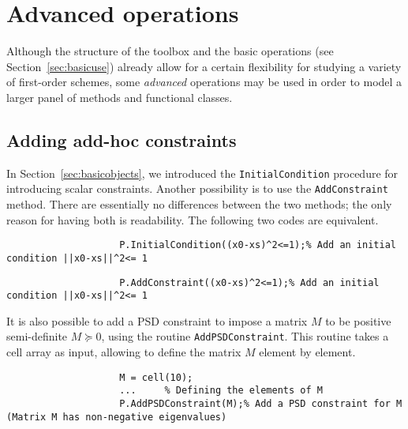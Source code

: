 \documentclass[11pt,a4paper]{article}
\begin{document}
					\section{Advanced operations}		%

					Although the structure of the toolbox and the basic operations (see Section~\ref{sec:basicuse}) already allow for a certain flexibility for studying a variety of first-order schemes, some \emph{advanced} operations may be used in order to model a larger panel of methods and functional classes.

					\subsection{Adding add-hoc constraints}\label{sec:constraints}
					In Section~\ref{sec:basicobjects}, we introduced the \verb?InitialCondition? procedure for introducing scalar constraints. Another possibility is to use the \verb?AddConstraint? method. There are essentially no differences between the two methods; the only reason for having both is readability. The following two codes are equivalent.\\[-1cm]
					\begin{lstlisting}
					P.InitialCondition((x0-xs)^2<=1);% Add an initial condition ||x0-xs||^2<= 1
					\end{lstlisting}\vspace{-.5cm}
					\begin{lstlisting}
					P.AddConstraint((x0-xs)^2<=1);% Add an initial condition ||x0-xs||^2<= 1
					\end{lstlisting}
					It is also possible to add a PSD constraint to impose a matrix $M$ to be positive semi-definite $M \succeq 0$, using the routine \verb?AddPSDConstraint?. This routine takes a cell array as input, allowing to define the matrix $M$ element by element. \\[-1cm] %
					\begin{lstlisting}
					M = cell(10);
					... 	% Defining the elements of M
					P.AddPSDConstraint(M);% Add a PSD constraint for M (Matrix M has non-negative eigenvalues)
					\end{lstlisting}
\end{document}
